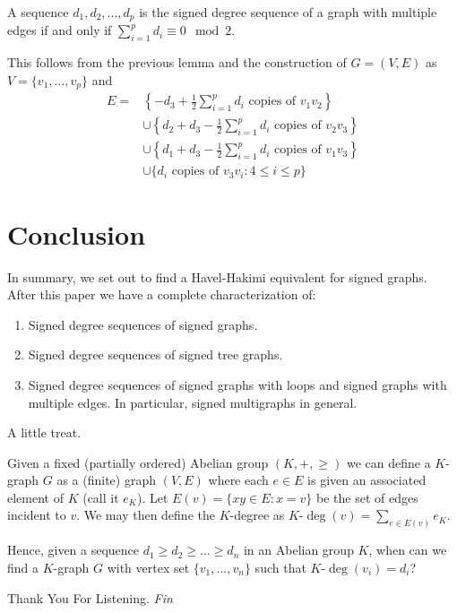 \begin{frame}
	\begin{theorem}
		A sequence $d_1, d_2, ..., d_p$ is the signed degree sequence of a graph with multiple edges if and only if $\sum_{i = 1}^{p} d_i \equiv 0 \mod 2$.
	\end{theorem}
	This follows from the previous lemma and the construction of $G = (V,E)$ as $V = \{ v_1, ..., v_p \}$ and 
		\begin{align*}
			E = 
				& \left\{ -d_3 + \frac{1}{2}\sum_{i = 1}^{p} d_i \text{ copies of }  v_1v_2\right\} \\
				& \cup \left\{ d_2 + d_3 - \frac{1}{2}\sum_{i = 1}^{p} d_i \text{ copies of } v_2v_3\right\} \\
				& \cup \left\{ d_1 + d_3 - \frac{1}{2}\sum_{i = 1}^{p} d_i \text{ copies of } v_1v_3\right\} \\ 
				& \cup \{ d_i \text{ copies of } v_3v_i : 4 \leq i \leq p \}
		\end{align*}
\end{frame}



\section{Conclusion}


\begin{frame}
	In summary, we set out to find a Havel-Hakimi equivalent for signed graphs. After this paper we have a complete characterization of:
		\begin{enumerate}
			\item Signed degree sequences of signed graphs.
			\item Signed degree sequences of signed tree graphs.
			\item Signed degree sequences of signed graphs with loops and signed graphs with multiple edges. In particular, signed multigraphs in general.
		\end{enumerate}
\end{frame}


\begin{frame}{A little treat.}
	\begin{problem}
		Given a fixed (partially ordered) Abelian group $(K, +, \geq)$ we can define a $K$-graph $G$ as a (finite) graph $(V,E)$ where each $e \in E$ is given an associated element of $K$ (call it $e_K$). Let $E(v) = \{ xy \in E : x = v \}$ be the set of edges incident to $v$. We may then define the $K$-degree as $K\text{-}\deg(v) = \sum_{e \in E(v)} e_K$. 
		
		Hence, given a sequence $d_1 \geq d_2 \geq ... \geq d_n$ in an Abelian group $K$, when can we find a $K$-graph $G$ with vertex set $\{ v_1, ..., v_n \}$ such that $K\text{-}\deg(v_i) = d_i$? 
	\end{problem}
\end{frame}

\begin{frame}{Thank You For Listening.}
	\centering \Huge
	\emph{Fin}
\end{frame}

